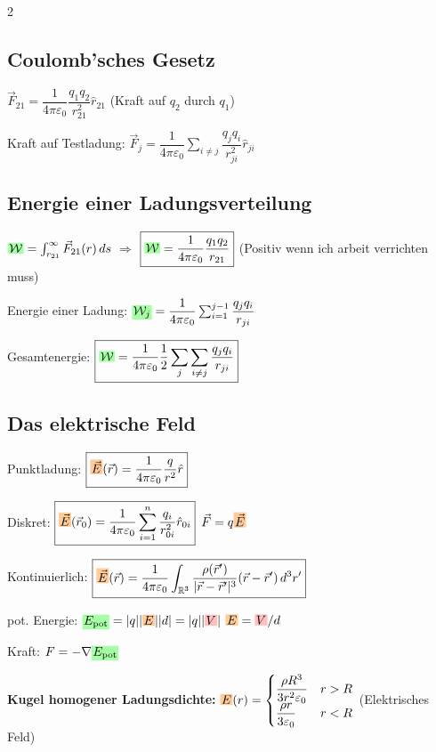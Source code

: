 \documentclass[10pt,a4paper]{article}
\newcommand{\ec}[1]{{\setlength\fboxsep{1pt}\colorbox{green!35}{\ensuremath{#1}}}}
\newcommand{\efc}[1]{{\setlength\fboxsep{1pt}\colorbox{orange!40}{\ensuremath{#1}}}}
\newcommand{\vc}[1]{{\setlength\fboxsep{1pt}\colorbox{red!25}{\ensuremath{#1}}}}
\begin{document}
\begin{multicols}{2}
\subsection{Coulomb'sches Gesetz}

$\boxed{\vec{F}_{21}=\dfrac{1}{4\pi\varepsilon_0}\dfrac{q_1 q_2}{r_{21}^2}\hat{r}_{21}}$ \quad (Kraft auf $q_2$ durch $q_1$)

Kraft auf Testladung: $\boxed{\vec{F}_j=\dfrac{1}{4\pi\varepsilon_0}\sum_{i\neq j}\dfrac{q_j q_i}{r_{ji}^2}\hat{r}_{ji}}$

\subsection{Energie einer Ladungsverteilung}

$\ec{\mathcal{W}}=\int_{r_{21}}^{\infty}\vec{F}_{21}(r)\,ds$ \quad $\Rightarrow$ $\boxed{\ec{\mathcal{W}}=\dfrac{1}{4\pi\varepsilon_0}\dfrac{q_1 q_2}{r_{21}}}$ (Positiv wenn ich arbeit verrichten muss)

Energie einer Ladung: $\ec{\mathcal{W}_j}=\dfrac{1}{4\pi\varepsilon_0}\sum_{i=1}^{j-1}\dfrac{q_j q_i}{r_{ji}}$

Gesamtenergie: $\boxed{\ec{\mathcal{W}}=\dfrac{1}{4\pi\varepsilon_0}\dfrac{1}{2}\sum_j\sum_{i\neq j}\dfrac{q_j q_i}{r_{ji}}}$

\subsection{Das elektrische Feld}

Punktladung: $\boxed{\efc{\vec{E}}(\vec{r})=\dfrac{1}{4\pi\varepsilon_0}\dfrac{q}{r^2}\hat{r}}$

Diskret: $\boxed{\efc{\vec{E}}(\vec{r}_0)=\dfrac{1}{4\pi\varepsilon_0}\sum_{i=1}^n\dfrac{q_i}{r_{0i}^2}\hat{r}_{0i}}$ \quad $\vec{F}=q\efc{\vec{E}}$

Kontinuierlich: $\boxed{\efc{\vec{E}}(\vec{r})=\dfrac{1}{4\pi\varepsilon_0}\int_{\mathbb{R}^3}\dfrac{\rho(\vec{r}')}{|\vec{r}-\vec{r}'|^3}(\vec{r}-\vec{r}')\,d^3r'}$

pot. Energie: $\ec{E_{\text{pot}}}=|q||\efc{E}||d|=|q||\vc{V}|$ \quad $\efc{E}=\vc{V}/d$

Kraft: $F=-\nabla \ec{E_{\text{pot}}}$

\textbf{Kugel homogener Ladungsdichte:}
$\efc{E}(r)=\begin{cases}\dfrac{\rho R^3}{3r^2\varepsilon_0} & r>R\\ \dfrac{\rho r}{3\varepsilon_0} & r<R\end{cases}$ (Elektrisches Feld)


\end{multicols}
\end{document}

